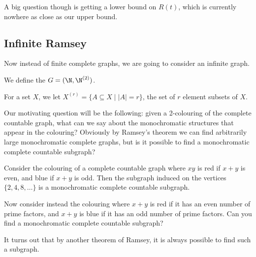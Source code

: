 A big question though is getting a lower bound on $R(t)$, which is currently nowhere as close as our upper bound.


\subsection{Infinite Ramsey}

Now instead of finite complete graphs, we are going to consider an infinite graph.

\begin{definition}
	We define the  $G = (\N, \N^{(2)})$.
\end{definition}

\begin{notation}
	For a set $X$, we let $X^{(r)} = \{A \subseteq X \mid |A| = r\}$, the set of $r$ element subsets of $X$.
\end{notation}

Our motivating question will be the following: given a 2-colouring of the complete countable graph, what can we say about the monochromatic structures that appear in the colouring? Obviously by Ramsey's theorem we can find arbitrarily large monochromatic complete graphs, but is it possible to find a monochromatic complete countable subgraph?

\begin{example}
	Consider the colouring of a complete countable graph where $xy$ is red if $x + y$ is even, and blue if $x + y$ is odd.
	Then the subgraph induced on the vertices $\{2, 4, 8, \dots\}$ is a monochromatic complete countable subgraph.

	Now consider instead the colouring where $x + y$ is red if it has an even number of prime factors, and $x + y$ is blue if it has an odd number of prime factors. Can you find a monochromatic complete countable subgraph?
\end{example}

It turns out that by another theorem of Ramsey, it is always possible to find such a subgraph.


